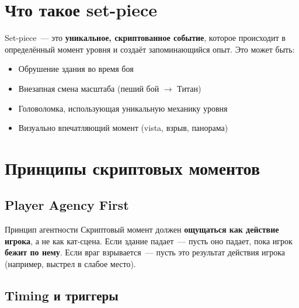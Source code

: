 \documentclass[a4paper,11pt]{report}
\begin{document}
\section{Что такое set-piece}

Set-piece~--- это \textbf{уникальное, скриптованное событие}, которое
происходит в определённый момент уровня и создаёт запоминающийся
опыт. Это может быть:

\begin{itemize}[leftmargin=*]
  \item Обрушение здания во время боя
  \item Внезапная смена масштаба (пеший бой $\to$ Титан)
  \item Головоломка, использующая уникальную механику уровня
  \item Визуально впечатляющий момент (vista, взрыв, панорама)
\end{itemize}

\section{Принципы скриптовых моментов}

\subsection{Player Agency First}

\begin{principle}{Принцип агентности}
Скриптовый момент должен \textbf{ощущаться как действие игрока},
а не как кат-сцена. Если здание падает~--- пусть оно падает,
пока игрок \textbf{бежит по нему}. Если враг взрывается~--- пусть это
результат действия игрока (например, выстрел в слабое место).
\end{principle}

\subsection{Timing и триггеры}
\end{document}
